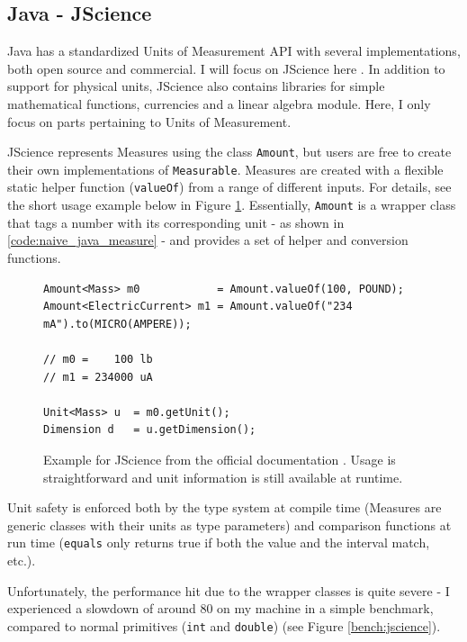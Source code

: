 \documentclass[12pt,oneside,a4paper]{scrbook}
\begin{document}
\subsection{Java - JScience}

Java has a standardized Units of Measurement API \citep{Units13} with several implementations, both open source and commercial. I will focus on JScience here \citep{Dautelle11}. In addition to support for physical units, JScience also contains libraries for simple mathematical functions, currencies and a linear algebra module. Here, I only focus on parts pertaining to Units of Measurement.

JScience represents Measures using the class \verb/Amount/, but users are free to create their own implementations of \verb/Measurable/. Measures are created with a flexible static helper function (\verb/valueOf/) from a range of different inputs. For details, see the short usage example below in Figure \ref{code:jscience_example}. Essentially, \verb/Amount/ is a wrapper class that tags a number with its corresponding unit - as shown in \ref{code:naive_java_measure} - and provides a set of helper and conversion functions.

\begin{figure}
\begin{verbatim}
Amount<Mass> m0            = Amount.valueOf(100, POUND);
Amount<ElectricCurrent> m1 = Amount.valueOf("234 mA").to(MICRO(AMPERE));

// m0 =    100 lb
// m1 = 234000 uA

Unit<Mass> u  = m0.getUnit();
Dimension d   = u.getDimension();

\end{verbatim}
\caption{Example for JScience from the official documentation \citep{Dautelle11}. Usage is straightforward and unit information is still available at runtime.}
\label{code:jscience_example}
\end{figure}

Unit safety is enforced both by the type system at compile time (Measures are generic classes with their units as type parameters) and comparison functions at run time (\verb/equals/ only returns true if both the value and the interval match, etc.).

Unfortunately, the performance hit due to the wrapper classes is quite severe - I experienced a slowdown of around 80 on my machine in a simple benchmark, compared to normal primitives (\verb/int/ and \verb/double/) (see Figure \ref{bench:jscience}).
\end{document}
